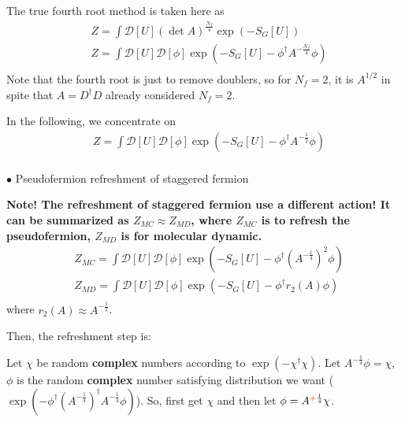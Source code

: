 The true fourth root method is taken here as
\begin{equation}
\begin{split}
&Z=\int \mathcal{D}[U] \left(\det A \right)^{\frac{N_f}{4}}\exp \left(-S_G[U]\right)\\
&Z=\int \mathcal{D}[U]  \mathcal {D}[\phi]\exp \left(-S_G[U]-\phi ^{\dagger} A^{-\frac{N_f}{4}} \phi \right)\\
\end{split}
\end{equation}
Note that the fourth root is just to remove doublers, so for $N_f=2$, it is $A^{1/2}$ in spite that $A=D^{\dagger}D$ already considered $N_f=2$.

In the following, we concentrate on
\begin{equation}
\begin{split}
&Z=\int \mathcal{D}[U]  \mathcal {D}[\phi]\exp \left(-S_G[U]-\phi ^{\dagger} A^{-\frac{1}{2}} \phi \right)\\
\end{split}
\end{equation}

$\bullet$ Pseudofermion refreshment of staggered fermion

\textbf{\textcolor[rgb]{1,0,0}{Note! The refreshment of staggered fermion use a different action!} It can be summarized as $Z_{MC}\approx Z_{MD}$, where $Z_{MC}$ is to refresh the pseudofermion, $Z_{MD}$ is for molecular dynamic.}
\begin{equation}
\begin{split}
&Z_{MC}=\int \mathcal{D}[U]  \mathcal {D}[\phi]\exp \left(-S_G[U]-\phi ^{\dagger} \left(A^{-\frac{1}{4}}\right)^2 \phi \right)\\
&Z_{MD}=\int \mathcal{D}[U]  \mathcal {D}[\phi]\exp \left(-S_G[U]-\phi ^{\dagger} r_2(A) \phi \right)\\
\end{split}
\end{equation}
where $r_2(A)\approx A^{-\frac{1}{2}}$.

Then, the refreshment step is:

Let $\chi$ be random \textbf{complex} numbers according to $\exp (-\chi ^{\dagger}\chi)$. Let $A^{-\frac{1}{4}}\phi=\chi$, $\phi$ is the random \textbf{complex} number satisfying distribution we want ($\exp (-\phi^{\dagger} \left(A^{-\frac{1}{4}}\right)^{\dagger} A^{-\frac{1}{4}} \phi)$). So, first get $\chi$ and then let $\phi = A^{\textcolor[rgb]{1,0,0}{+}\frac{1}{4}}\chi$.

